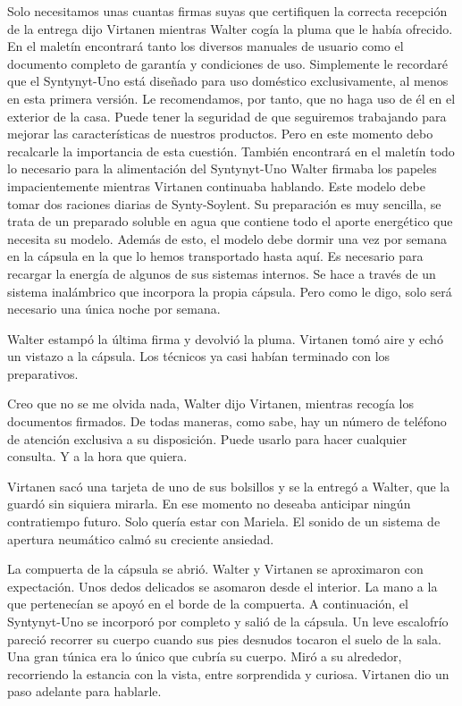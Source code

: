 	\reply Solo necesitamos unas cuantas firmas suyas que certifiquen la correcta recepción de la entrega \pause dijo Virtanen mientras Walter cogía la pluma que le había ofrecido\pauseend. En el maletín encontrará tanto los diversos manuales de usuario como el documento completo de garantía y condiciones de uso. Simplemente le recordaré que el Syntynyt-Uno está diseñado para uso doméstico exclusivamente, al menos en esta primera versión. Le recomendamos, por tanto, que no haga uso de él en el exterior de la casa. Puede tener la seguridad de que seguiremos trabajando para mejorar las características de nuestros productos. Pero en este momento debo recalcarle la importancia de esta cuestión. También encontrará en el maletín todo lo necesario para la alimentación del Syntynyt-Uno \pause Walter firmaba los papeles impacientemente mientras Virtanen continuaba hablando\pauseend. Este modelo debe tomar dos raciones diarias de Synty-Soylent. Su preparación es muy sencilla, se trata de un preparado soluble en agua que contiene todo el aporte energético que necesita su modelo. Además de esto, el modelo debe dormir una vez por semana en la cápsula en la que lo hemos transportado hasta aquí. Es necesario para recargar la energía de algunos de sus sistemas internos. Se hace a través de un sistema inalámbrico que incorpora la propia cápsula. Pero como le digo, solo será necesario una única noche por semana.
	
Walter estampó la última firma y devolvió la pluma. Virtanen tomó aire y echó un vistazo a la cápsula. Los técnicos ya casi habían terminado con los preparativos.
	
	\reply Creo que no se me olvida nada, Walter \pause dijo Virtanen, mientras recogía los documentos firmados\pauseend. De todas maneras, como sabe, hay un número de teléfono de atención exclusiva a su disposición. Puede usarlo para hacer cualquier consulta. Y a la hora que quiera.
	
Virtanen sacó una tarjeta de uno de sus bolsillos y se la entregó a Walter, que la guardó sin siquiera mirarla. En ese momento no deseaba anticipar ningún contratiempo futuro. Solo quería estar con Mariela. El sonido de un sistema de apertura neumático calmó su creciente ansiedad.

La compuerta de la cápsula se abrió. Walter y Virtanen se aproximaron con expectación. Unos dedos delicados se asomaron desde el interior. La mano a la que pertenecían se apoyó en el borde de la compuerta. A continuación, el Syntynyt-Uno se incorporó por completo y salió de la cápsula. Un leve escalofrío pareció recorrer su cuerpo cuando sus pies desnudos tocaron el suelo de la sala. Una gran túnica era lo único que cubría su cuerpo. Miró a su alrededor, recorriendo la estancia con la vista, entre sorprendida y curiosa. Virtanen dio un paso adelante para hablarle.